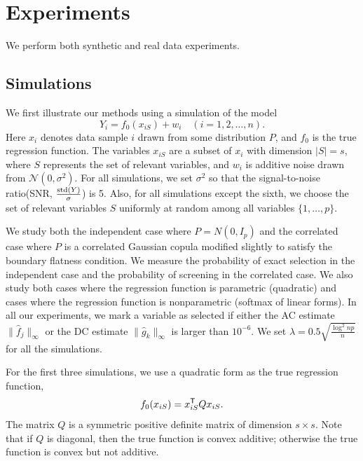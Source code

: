 \def\x{x}
\def\Q{Q}
\def\bds#1{#1}
\def\tts#1{\texttt{\small #1}}

\section{Experiments}
\label{sec:thesims}

We perform both synthetic and real data experiments.

\subsection{Simulations}
We first illustrate our methods using a simulation of the model
\begin{equation}\nonumber
         Y_i = f_0(\x_{iS}) + w_i \quad (i=1,2,\ldots,n).
\end{equation}
Here $\x_{i}$ denotes data sample $i$ drawn from some distribution
$P$, and $f_0$ is the true regression function. The variables
$\x_{iS}$ are a subset of $\x_i$ with dimension $|S|=s$, where $S$
represents the set of relevant variables, and $w_i$ is additive
noise drawn from $\mathcal{N}(0,\sigma^2)$. For all simulations, we set
$\sigma^2$ so that the signal-to-noise ratio(SNR,
$\frac{\textrm{std}(Y)}{\sigma}$) is 5. Also, for all simulations except
the sixth, we choose the set of relevant variables $S$ uniformly at
random among all variables $\{1,\ldots,p\}$.

We study both the independent case where $P = N(0, I_p)$ and the
correlated case where $P$ is a correlated Gaussian copula modified
slightly to satisfy the boundary flatness condition. We measure the
probability of exact selection in the independent case and the
probability of screening in the correlated case. We also study both
cases where the regression function is parametric (quadratic) and
cases where the regression function is nonparametric (softmax of
linear forms). In all our experiments, we mark a variable as selected
if either the AC estimate $\| \hat{f}_j \|_\infty$ or the DC estimate
$\| \hat{g}_k \|_\infty$ is larger than $10^{-6}$. We set $\lambda =
0.5 \sqrt{\frac{\log^2 np}{n}}$ for all the simulations.

For the first three simulations, we use a quadratic form as the true regression function,
\[
f_0(x_{iS}) = x_{iS}^\tran \Q x_{iS}.
\]
The matrix $\Q$ is a symmetric positive definite matrix of dimension $s \times{} s$. 
Note that if $\Q$ is diagonal, then the true function is convex
additive; 
otherwise the true function is convex but not additive.

